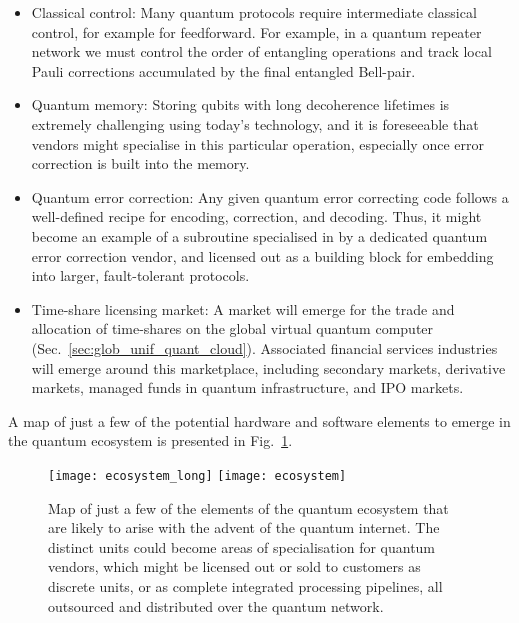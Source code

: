 \begin{itemize}
\item Classical control: Many quantum protocols require intermediate classical control, for example for feedforward. For example, in a quantum repeater network we must control the order of entangling operations and track local Pauli corrections accumulated by the final entangled Bell-pair.

\item Quantum memory: Storing qubits with long decoherence lifetimes is extremely challenging using today's technology, and it is foreseeable that vendors might specialise in this particular operation, especially once error correction is built into the memory. 

\item Quantum error correction: Any given quantum error correcting code follows a well-defined recipe for encoding, correction, and decoding. Thus, it might become an example of a subroutine specialised in by a dedicated quantum error correction vendor, and licensed out as a building block for embedding into larger, fault-tolerant protocols.

\item Time-share licensing market: A market will emerge for the trade and allocation of time-shares on the global virtual quantum computer (Sec.~\ref{sec:glob_unif_quant_cloud}). Associated financial services industries will emerge around this marketplace, including secondary markets, derivative markets, managed funds in quantum infrastructure, and IPO markets.
\end{itemize}

A map of just a few of the potential hardware and software elements to emerge in the quantum ecosystem is presented in Fig.~\ref{fig:ecosystem}.

\begin{figure}[!htpb]
\pubmode
\texttt{[image: ecosystem\_long]}
\else
\texttt{[image: ecosystem]}
\fi
\caption{Map of just a few of the elements of the quantum ecosystem that are likely to arise with the advent of the quantum internet. The distinct units could become areas of specialisation for quantum vendors, which might be licensed out or sold to customers as discrete units, or as complete integrated processing pipelines, all outsourced and distributed over the quantum network.}\label{fig:ecosystem}	
\end{figure}